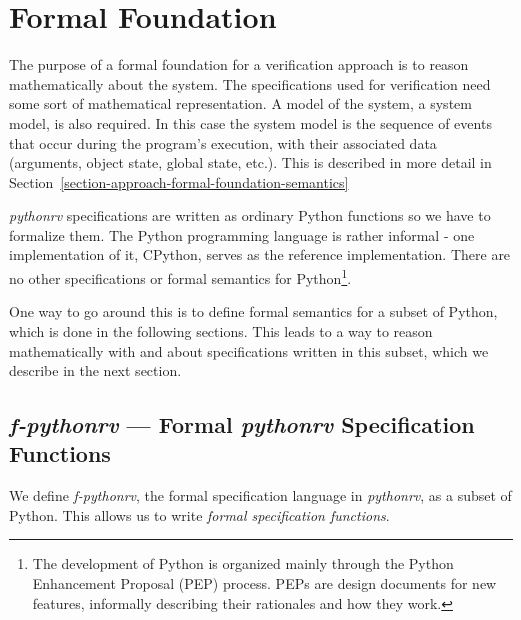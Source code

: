 
\section{Formal Foundation} \label{section-approach-formal-foundation}

The purpose of a formal foundation for a verification approach is to reason
mathematically about the system. The specifications used for verification need
some sort of mathematical representation. A model of the system, a system
model, is also required. In this case the system model is the sequence of
events that occur during the program's execution, with their associated data
(arguments, object state, global state, etc.). This is described in more detail
in Section~\ref{section-approach-formal-foundation-semantics}

\textit{pythonrv} specifications are written as ordinary Python functions so we
have to formalize them.  The Python programming language is rather informal -
one implementation of it, CPython, serves as the reference implementation.
There are no other specifications or formal semantics for Python\footnote{The
development of Python is organized mainly through the Python Enhancement
Proposal (PEP) process. PEPs are design documents for new features,
informally describing their rationales and how they work.}.

One way to go around this is to define formal semantics for a subset of Python,
which is done in the following sections. This leads to a way to reason
mathematically with and about specifications written in this subset, which we
describe in the next section.





\subsection{\textit{f-pythonrv} --- Formal \textit{pythonrv} Specification Functions}
\label{section-approach-python-subset}
\lstset{language=Python,numbers=left}

We define \textit{f-pythonrv}, the formal specification language in
\textit{pythonrv}, as a subset of Python. This allows us to write
\textit{formal specification functions}.

